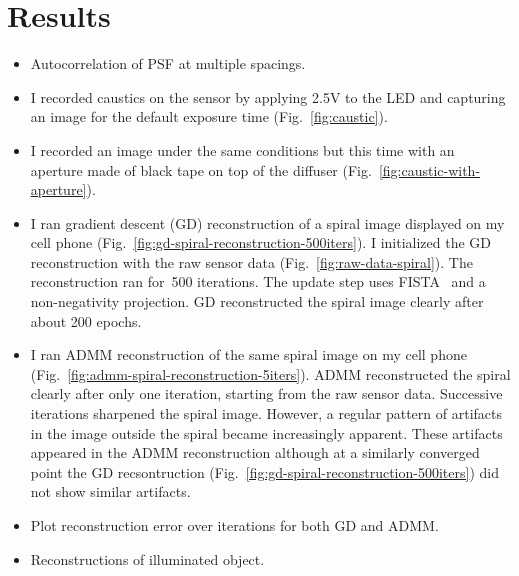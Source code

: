 \documentclass[final]{cvpr}
\begin{document}
\section{Results}

\begin{itemize}
	\item Autocorrelation of PSF at multiple spacings.

	\item I recorded caustics on the sensor by applying 2.5V to the LED and capturing an image for the default exposure time (Fig.~\ref{fig:caustic}).

	\item I recorded an image under the same conditions but this time with
	      an aperture made of black tape on top of the diffuser
	      (Fig.~\ref{fig:caustic-with-aperture}).

	\item I ran gradient descent (GD) reconstruction of a spiral image displayed
	      on my cell phone
	      (Fig.~\ref{fig:gd-spiral-reconstruction-500iters}).
	      I initialized the GD reconstruction with the raw sensor data
	      (Fig.~\ref{fig:raw-data-spiral}).
	      The reconstruction ran for~\num{500} iterations.
	      The update step uses FISTA~\cite{beck2009fast} and a
	      non-negativity projection.
	      GD reconstructed the spiral image clearly after about 200 epochs.

	\item I ran ADMM reconstruction of the same spiral image on my cell phone
	      (Fig.~\ref{fig:admm-spiral-reconstruction-5iters}).
	      ADMM reconstructed the spiral clearly after only one iteration,
	      starting from the raw sensor data.
	      Successive iterations sharpened the spiral image.
	      However, a regular pattern of artifacts in the image outside the
	      spiral became increasingly apparent.
	      These artifacts appeared in the ADMM reconstruction although at a
	      similarly converged point the GD recsontruction
	      (Fig.~\ref{fig:gd-spiral-reconstruction-500iters}) did not show
	      similar artifacts.

	\item Plot reconstruction error over iterations for both GD and ADMM\@.

	\item Reconstructions of illuminated object.
\end{itemize}
\end{document}
